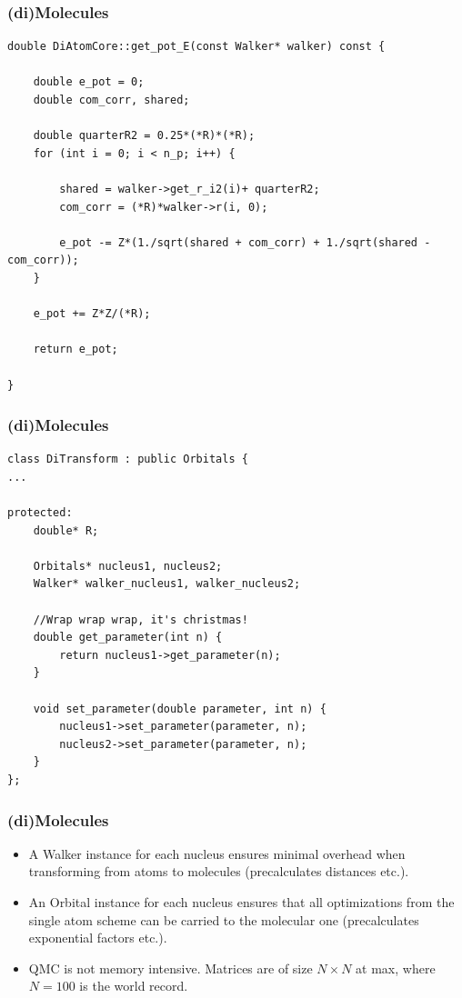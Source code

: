 \documentclass{beamer}
\begin{document}
\begin{frame}[containsverbatim]\frametitle{(di)Molecules}
\scriptsize
\begin{verbatim}
double DiAtomCore::get_pot_E(const Walker* walker) const {
    
    double e_pot = 0;
    double com_corr, shared;
    
    double quarterR2 = 0.25*(*R)*(*R);
    for (int i = 0; i < n_p; i++) {
        
        shared = walker->get_r_i2(i)+ quarterR2;
        com_corr = (*R)*walker->r(i, 0);
        
        e_pot -= Z*(1./sqrt(shared + com_corr) + 1./sqrt(shared - com_corr));
    }

    e_pot += Z*Z/(*R);
    
    return e_pot;
    
}
\end{verbatim}
\normalsize
\end{frame}


\begin{frame}[containsverbatim]\frametitle{(di)Molecules}
\scriptsize
\begin{verbatim}
class DiTransform : public Orbitals {
...

protected:
    double* R;

    Orbitals* nucleus1, nucleus2;
    Walker* walker_nucleus1, walker_nucleus2;

    //Wrap wrap wrap, it's christmas!
    double get_parameter(int n) {
        return nucleus1->get_parameter(n);
    }

    void set_parameter(double parameter, int n) {
        nucleus1->set_parameter(parameter, n);
        nucleus2->set_parameter(parameter, n);
    }
};
\end{verbatim}
\normalsize
\end{frame}

\begin{frame}\frametitle{(di)Molecules}
\begin{itemize}
 \item A Walker instance for each nucleus ensures minimal overhead when transforming from atoms to molecules (precalculates distances etc.). \pause
 \item An Orbital instance for each nucleus ensures that all optimizations from the single atom scheme can be carried to the molecular one (precalculates exponential factors etc.). \pause
 \item QMC is not memory intensive. Matrices are of size $N \times N$ at max, where $N=100$ is the world record.
\end{itemize}

\end{frame}
\end{document}

